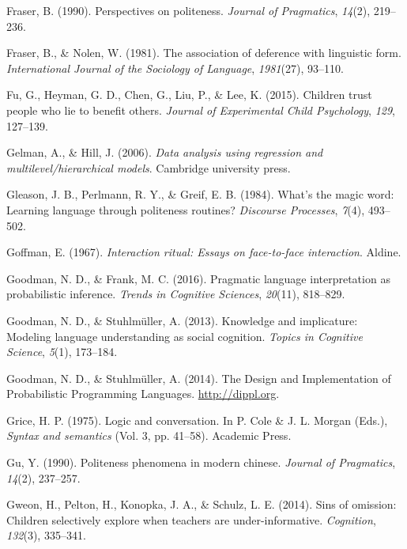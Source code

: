 \documentclass[oneside]{report}
\begin{document}
\hypertarget{ref-fraser1990}{}
Fraser, B. (1990). Perspectives on politeness. \emph{Journal of
Pragmatics}, \emph{14}(2), 219--236.

\hypertarget{ref-fraser1981}{}
Fraser, B., \& Nolen, W. (1981). The association of deference with
linguistic form. \emph{International Journal of the Sociology of
Language}, \emph{1981}(27), 93--110.

\hypertarget{ref-fu2015}{}
Fu, G., Heyman, G. D., Chen, G., Liu, P., \& Lee, K. (2015). Children
trust people who lie to benefit others. \emph{Journal of Experimental
Child Psychology}, \emph{129}, 127--139.

\hypertarget{ref-gelman2006data}{}
Gelman, A., \& Hill, J. (2006). \emph{Data analysis using regression and
multilevel/hierarchical models}. Cambridge university press.

\hypertarget{ref-gleason1984}{}
Gleason, J. B., Perlmann, R. Y., \& Greif, E. B. (1984). What's the
magic word: Learning language through politeness routines?
\emph{Discourse Processes}, \emph{7}(4), 493--502.

\hypertarget{ref-goffman1967}{}
Goffman, E. (1967). \emph{Interaction ritual: Essays on face-to-face
interaction}. Aldine.

\hypertarget{ref-goodman2016}{}
Goodman, N. D., \& Frank, M. C. (2016). Pragmatic language
interpretation as probabilistic inference. \emph{Trends in Cognitive
Sciences}, \emph{20}(11), 818--829.

\hypertarget{ref-goodman2013}{}
Goodman, N. D., \& Stuhlmüller, A. (2013). Knowledge and implicature:
Modeling language understanding as social cognition. \emph{Topics in
Cognitive Science}, \emph{5}(1), 173--184.

\hypertarget{ref-dippl}{}
Goodman, N. D., \& Stuhlmüller, A. (2014). The Design and Implementation
of Probabilistic Programming Languages. \url{http://dippl.org}.

\hypertarget{ref-grice1975}{}
Grice, H. P. (1975). Logic and conversation. In P. Cole \& J. L. Morgan
(Eds.), \emph{Syntax and semantics} (Vol. 3, pp. 41--58). Academic
Press.

\hypertarget{ref-gu1990}{}
Gu, Y. (1990). Politeness phenomena in modern chinese. \emph{Journal of
Pragmatics}, \emph{14}(2), 237--257.

\hypertarget{ref-gweon2014}{}
Gweon, H., Pelton, H., Konopka, J. A., \& Schulz, L. E. (2014). Sins of
omission: Children selectively explore when teachers are
under-informative. \emph{Cognition}, \emph{132}(3), 335--341.
\end{document}
